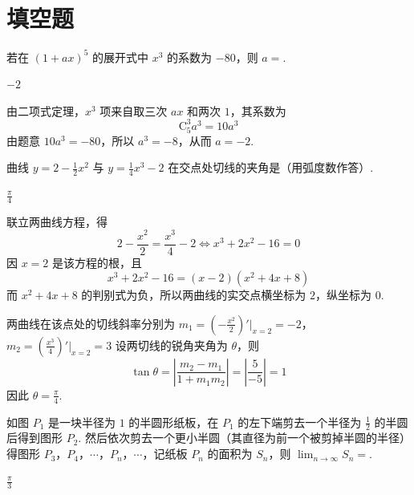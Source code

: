\section{填空题}
\begin{problem}
若在 \((1+ax)^5\) 的展开式中 \(x^3\) 的系数为 \(-80\)，则 \(a=\)\fillinblank{}.
\end{problem}

\begin{answer}
\(-2\)
\end{answer}

\begin{solution}
由二项式定理，\(x^3\) 项来自取三次 \(ax\) 和两次 \(1\)，其系数为
\[
\mathrm C_5^3a^3=10a^3\]
由题意 \(10a^3=-80\)，所以 \(a^3=-8\)，从而 \(a=-2\).
\end{solution}

\begin{problem}
曲线 \(y=2-\frac{1}{2}x^2\) 与 \(y=\frac{1}{4}x^3-2\) 在交点处切线的夹角是\fillinblank{}（用弧度数作答）.
\end{problem}

\begin{answer}
\(\frac{\pi}{4}\)
\end{answer}

\begin{solution}
联立两曲线方程，得
\[
2-\frac{x^2}{2}=\frac{x^3}{4}-2\Longleftrightarrow x^3+2x^2-16=0\]
因 \(x=2\) 是该方程的根，且
\[
x^3+2x^2-16=(x-2)(x^2+4x+8)
\]
而 \(x^2+4x+8\) 的判别式为负，所以两曲线的实交点横坐标为 \(2\)，纵坐标为 \(0\).

两曲线在该点处的切线斜率分别为
\(m_1=\left(-\frac{x^2}{2}\right)'\bigg|_{x=2}=-2\)，\(m_2=\left(\frac{x^3}{4}\right)'\bigg|_{x=2}=3\)
设两切线的锐角夹角为 \(\theta\)，则
\[
\tan\theta=\left|\frac{m_2-m_1}{1+m_1m_2}\right|=\left|\frac{5}{-5}\right|=1\]
因此 \(\theta=\frac{\pi}{4}\).
\end{solution}

\begin{problem}
如图 \(P_1\) 是一块半径为 \(1\) 的半圆形纸板，在 \(P_1\) 的左下端剪去一个半径为 \(\frac{1}{2}\) 的半圆后得到图形 \(P_2\). 然后依次剪去一个更小半圆（其直径为前一个被剪掉半圆的半径）得图形 \(P_3\)，\(P_4\)，\(\cdots\)，\(P_n\)，\(\cdots\)，记纸板 \(P_n\) 的面积为 \(S_n\)，则 \(\displaystyle\lim_{n\to\infty}S_n=\)\fillinblank{}.
\end{problem}

\begin{answer}
\(\frac{\pi}{3}\)
\end{answer}

